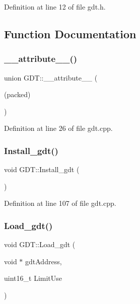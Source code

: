 Definition at line 12 of file gdt.\+h.



\subsection{Function Documentation}
\mbox{\label{namespace_g_d_t_aafeef73468f65116a440104dd6359e4c}} 
\subsubsection{\texorpdfstring{\+\_\+\+\_\+attribute\+\_\+\+\_\+()}{\_\_attribute\_\_()}}
{\footnotesize\ttfamily union G\+D\+T\+::\+\_\+\+\_\+attribute\+\_\+\+\_\+ (\begin{DoxyParamCaption}\item[{(packed)}]{ }\end{DoxyParamCaption})}



Definition at line 26 of file gdt.\+cpp.

\mbox{\label{namespace_g_d_t_a174feb7c5a037cc991bf4eb27c256366}} 
\subsubsection{\texorpdfstring{Install\+\_\+gdt()}{Install\_gdt()}}
{\footnotesize\ttfamily void G\+D\+T\+::\+Install\+\_\+gdt (\begin{DoxyParamCaption}{ }\end{DoxyParamCaption})}



Definition at line 107 of file gdt.\+cpp.

\mbox{\label{namespace_g_d_t_a3660563d28e3bab08ddac58ca6844b58}} 
\subsubsection{\texorpdfstring{Load\+\_\+gdt()}{Load\_gdt()}}
{\footnotesize\ttfamily void G\+D\+T\+::\+Load\+\_\+gdt (\begin{DoxyParamCaption}\item[{void $\ast$}]{gdt\+Address,  }\item[{uint16\+\_\+t}]{Limit\+Use }\end{DoxyParamCaption})\hspace{0.3cm}{\ttfamily [inline]}}



